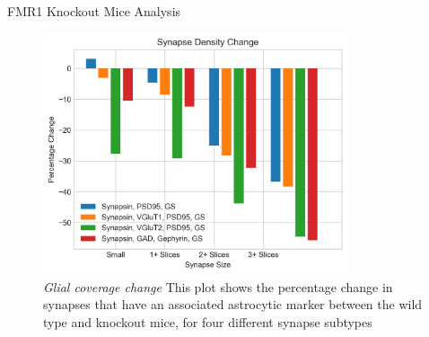 \documentclass[final, table]{beamer}
\newlength{\onecolwid}
\begin{document}
\begin{frame}[t]
\begin{columns}[t]
\begin{column}{\onecolwid}
\begin{block}{FMR1 Knockout Mice Analysis}
\begin{figure}
\centering
\includegraphics[width=0.8\textwidth]{figs/AstroSynapse_Density_Change}
\caption{\textit{Glial coverage change} This plot shows the percentage change in synapses that have an associated astrocytic marker between the wild type and knockout mice, for four different synapse subtypes}
\end{figure}




\end{block} 



\vspace{-0.05in}

\end{column}


\end{columns}
\end{frame}
\end{document}

